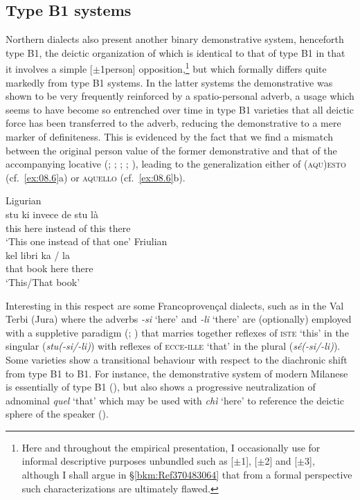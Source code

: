\documentclass[output=paper]{langsci/langscibook}
\begin{document}
\subsection{Type B1 systems}\label{bkm:Ref370487849}

Northern  dialects also present another binary demonstrative system,\linebreak
henceforth type B1, the deictic organization of which is identical to
that of type B1 in that it involves a simple [$\pm$1person]
opposition,\footnote{Here and throughout the empirical presentation, I
    occasionally use for informal descriptive purposes unbundled 
    such as [$\pm$1], [$\pm$2] and [$\pm$3], although I shall argue in
    §\ref{bkm:Ref370483064} that from a formal perspective such characterizations
are ultimately flawed.} but which formally differs quite markedly from type
B1 systems. In the latter systems the demonstrative was shown to be very
frequently reinforced by a spatio-personal adverb, a usage which seems to have
become so entrenched over time in type B1 varieties that all deictic
force has been transferred to the adverb, reducing the demonstrative to a mere
marker of definiteness. This is evidenced by the fact that we find a mismatch
between the original person value of the former demonstrative and that of the
accompanying locative (\citealt[21]{Berruto:1974a};
\citealt[171]{Azaretti:1982a}; \citealt[241]{Parry:1997a};
\citealt[112f]{Vanelli:1997a}; \citealt[107--110]{Irsara:2009a}), leading to
the generalization either of (\textsc{aqu)esto} (cf.\ \ref{ex:08.6}a) or \textsc{aquello} (cf.\ \ref{ex:08.6}b).

\ea\label{ex:08.6}
\ea\label{bkm:Ref370498429}Ligurian \citep{Azaretti:1982a}\\
\gll     stu  ki  invece  de  stu  là\\
this  here  instead  of  this  there\\
\glt \enquote*{This one instead of that one}
\ex Friulian \citep{Vanelli:1997a}\\
\gll  kel  libri  ka  /  la\\
that  book  here {} there\\
\glt \enquote*{This/That book}
\z
\z

Interesting in this respect are some Francoprovençal dialects, such as in the
Val Terbi (Jura) where the adverbs \emph{-si} ‘here’ and
\emph{-li} ‘there’ are (optionally) employed with a suppletive
paradigm (\citealt{Kjellman:1928a}; \citealt[85]{Butz:1981a}) that marries
together reflexes of \textsc{iste} ‘this’ in the singular (\emph{stu(-si/-li)})
with reflexes of \textsc{ecce-ille} ‘that’ in the plural (\emph{sé(-si/-li)}).
Some varieties show a transitional behaviour with respect to the diachronic
shift from type B1 to B1. For instance, the demonstrative system
of modern Milanese is essentially of type B1
(\citealt[79]{Ledgeway:2015a}), but also shows a progressive neutralization of
adnominal \emph{quel} ‘that’ which may be used with \emph{chì} ‘here’ to
reference the deictic sphere of the speaker (\citealt[108f]{Irsara:2009a}).
\end{document}
